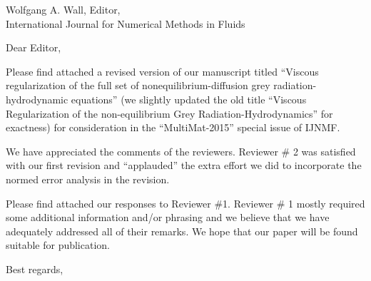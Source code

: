 
        \addtolength{\topmargin}{-4.0cm}    %
       \addtolength{\textheight}{7.5cm}    %

\address{Jean Ragusa\\ 
Department of Nuclear Engineering \\
Texas A\&M University\\
College Station, TX 77843-3133, USA\\
phone: (979) 862 2033\\
e-mail: jean.ragusa@tamu.edu \vspace{0.5cm}}


\signature{\vspace{-1.25cm}Marc-Olivier Delchini, Jean Ragusa, Jim Ferguson}   




\begin{letter}{
    Wolfgang A. Wall, Editor,\\
    International Journal for Numerical Methods in Fluids}
\date{\today}

\opening{Dear Editor,}
         \vspace{0.25cm}

Please find attached a revised version of our manuscript titled 
``Viscous regularization of the full set of nonequilibrium-diffusion grey radiation-hydrodynamic equations''
(we slightly updated the old title ``Viscous Regularization of the non-equilibrium Grey Radiation-Hydrodynamics'' 
for exactness) for consideration in the ``MultiMat-2015'' special issue of IJNMF. 

We have appreciated the comments of the reviewers. Reviewer \# 2 was satisfied with our first revision
and ``applauded'' the extra effort we did to incorporate the normed error analysis in the revision.

Please find attached our responses to Reviewer \#1. Reviewer \# 1 mostly required
some additional information and/or phrasing and  we believe that we have adequately addressed 
all of their remarks. We hope that our paper will be found suitable for publication.




\closing{Best regards, }

\end{letter}


